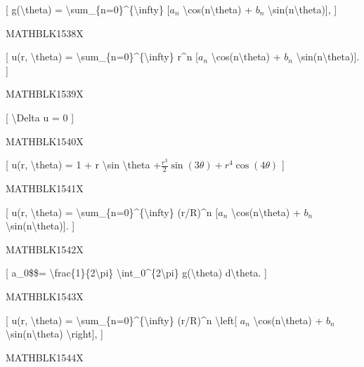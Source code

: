\documentclass[
]{article}
\begin{document}
{{{{[} g(\textbackslash theta) =
\textbackslash sum\_\{n=0\}\^{}\{\textbackslash infty\} {[}\(a_n\)
\textbackslash cos(n\textbackslash theta) + \(b_n\)
\textbackslash sin(n\textbackslash theta){]}, {]}

MATHBLK1538X

{[} u(r, \textbackslash theta) =
\textbackslash sum\_\{n=0\}\^{}\{\textbackslash infty\} r\^{}n
{[}\(a_n\) \textbackslash cos(n\textbackslash theta) + \(b_n\)
\textbackslash sin(n\textbackslash theta){]}. {]}

MATHBLK1539X

{[} \textbackslash Delta u = 0 {]}

MATHBLK1540X

{[} u(r, \textbackslash theta) = 1 + r \textbackslash sin
\textbackslash theta
+\(\frac{r^3}{2} \sin (3\theta) + r^4 \cos (4\theta)\) {]}

MATHBLK1541X

{[} u(r, \textbackslash theta) =
\textbackslash sum\_\{n=0\}\^{}\{\textbackslash infty\} (r/R)\^{}n
{[}\(a_n\) \textbackslash cos(n\textbackslash theta) + \(b_n\)
\textbackslash sin(n\textbackslash theta){]}. {]}

MATHBLK1542X

{[} a\_0\$\$= \textbackslash frac\{1\}\{2\textbackslash pi\}
\textbackslash int\_0\^{}\{2\textbackslash pi\} g(\textbackslash theta)
d\textbackslash theta. {]}

MATHBLK1543X

{[} u(r, \textbackslash theta) =
\textbackslash sum\_\{n=0\}\^{}\{\textbackslash infty\} (r/R)\^{}n
\textbackslash left{[} \(a_n\) \textbackslash cos(n\textbackslash theta)
+ \(b_n\) \textbackslash sin(n\textbackslash theta)
\textbackslash right{]}, {]}

MATHBLK1544X

}}}
\end{document}
